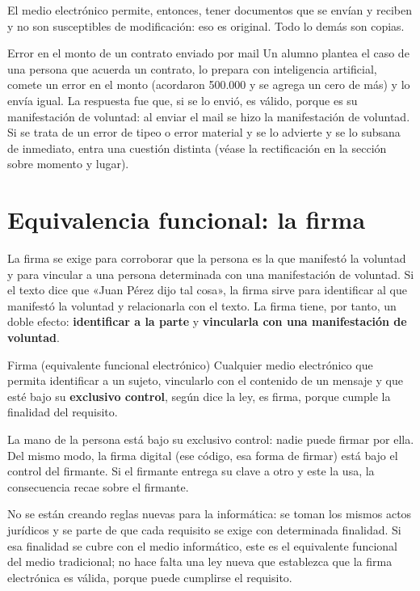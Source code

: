 \documentclass[12pt,oneside]{book}
\begin{document}
El medio electrónico permite, entonces, tener documentos que se envían y reciben y no son susceptibles de modificación: eso es original. Todo lo demás son copias.

\begin{example}{Error en el monto de un contrato enviado por mail}
Un alumno plantea el caso de una persona que acuerda un contrato, lo prepara con inteligencia artificial, comete un error en el monto (acordaron 500.000 y se agrega un cero de más) y lo envía igual. La respuesta fue que, si se lo envió, es válido, porque es su manifestación de voluntad: al enviar el mail se hizo la manifestación de voluntad. Si se trata de un error de tipeo o error material y se lo advierte y se lo subsana de inmediato, entra una cuestión distinta (véase la rectificación en la sección sobre momento y lugar).
\end{example}

\section{Equivalencia funcional: la firma}

La firma se exige para corroborar que la persona es la que manifestó la voluntad y para vincular a una persona determinada con una manifestación de voluntad. Si el texto dice que «Juan Pérez dijo tal cosa», la firma sirve para identificar al que manifestó la voluntad y relacionarla con el texto. La firma tiene, por tanto, un doble efecto: \textbf{identificar a la parte} y \textbf{vincularla con una manifestación de voluntad}.

\begin{definition}{Firma (equivalente funcional electrónico)}
Cualquier medio electrónico que permita identificar a un sujeto, vincularlo con el contenido de un mensaje y que esté bajo su \textbf{exclusivo control}, según dice la ley, es firma, porque cumple la finalidad del requisito.
\end{definition}

La mano de la persona está bajo su exclusivo control: nadie puede firmar por ella. Del mismo modo, la firma digital (ese código, esa forma de firmar) está bajo el control del firmante. Si el firmante entrega su clave a otro y este la usa, la consecuencia recae sobre el firmante.

No se están creando reglas nuevas para la informática: se toman los mismos actos jurídicos y se parte de que cada requisito se exige con determinada finalidad. Si esa finalidad se cubre con el medio informático, este es el equivalente funcional del medio tradicional; no hace falta una ley nueva que establezca que la firma electrónica es válida, porque puede cumplirse el requisito.
\end{document}
